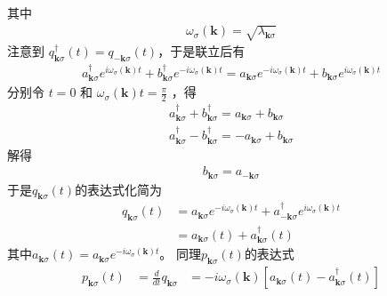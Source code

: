 其中 
\begin{equation}
    \begin{aligned} 
        \omega_\sigma (\mathbf{k} ) = \sqrt{\lambda_{\mathbf{k}\sigma }}
    \end{aligned} 
\end{equation}
注意到 $  q^\dagger_{\mathbf{k}\sigma}(t) = q_{\mathbf{-k}\sigma}(t)$，于是联立后有
\begin{equation}
    \begin{aligned} 
        a^\dagger_{\mathbf{k}\sigma}e^{i\omega_\sigma (\mathbf{k} )t}
        + b^\dagger_{\mathbf{k}\sigma}e^{-i\omega_\sigma (\mathbf{k} )t} =
        a_{\mathbf{k}\sigma}e^{-i\omega_\sigma (\mathbf{k} )t}
        + b_{\mathbf{k}\sigma}e^{i\omega_\sigma (\mathbf{k} )t}
    \end{aligned} 
\end{equation}
分别令 $ t = 0 $ 和 $\omega_\sigma (\mathbf{k} )t = \frac{\pi}{2}  $  ，得 
\begin{equation}
    \begin{aligned} 
        a^\dagger_{\mathbf{k}\sigma}
        + b^\dagger_{\mathbf{k}\sigma}=
        a_{\mathbf{k}\sigma}
        + b_{\mathbf{k}\sigma} \\
        a^\dagger_{\mathbf{k}\sigma}
        - b^\dagger_{\mathbf{k}\sigma}=
        -a_{\mathbf{k}\sigma}
        + b_{\mathbf{k}\sigma}
    \end{aligned} 
\end{equation}
解得 
\begin{equation}
    \begin{aligned} 
        b_{\mathbf{k}\sigma}  = a_{-\mathbf{k}\sigma}
    \end{aligned} 
\end{equation}
于是$q_{\mathbf{k}\sigma}(t)$的表达式化简为
\begin{equation}
    \begin{aligned} 
        q_{\mathbf{k}\sigma}(t) &= a_{\mathbf{k}\sigma}e^{-i\omega_\sigma (\mathbf{k} )t}
        + a^\dagger_{-\mathbf{k}\sigma}e^{i\omega_\sigma (\mathbf{k} )t} \\
            &= a_{\mathbf{k}\sigma} (t) + a^\dagger_{\mathbf{k}\sigma }(t)
    \end{aligned} 
\end{equation}
其中$a_{\mathbf{k}\sigma} (t) = a_{\mathbf{k}\sigma}e^{-i\omega_\sigma (\mathbf{k} )t}$。
同理$ p_{\mathbf{k}\sigma}(t)$的表达式
\begin{equation}
    \begin{aligned} 
        p_{\mathbf{k}\sigma}(t) &= \frac{d}{dt} q_{\mathbf{k}\sigma}
        &= -i\omega_{\sigma}(\mathbf{k} )[a_{\mathbf{k}\sigma} (t) - a^\dagger_{\mathbf{k}\sigma }(t)]
    \end{aligned} 
\end{equation}
